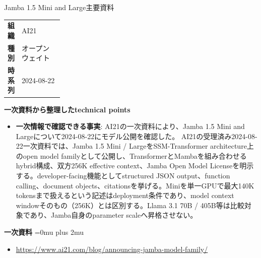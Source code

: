 \begin{technicalnote}{Jamba 1.5 Mini and Large}{主要資料}
\begingroup
\begin{tabularx}{\linewidth}{@{}>{\bfseries}p{0.22\linewidth}X@{}}
組織 & AI21 \\
種別 & オープンウェイト \\
時系列 & 2024-08-22 \\
\end{tabularx}
\smallskip
{\bfseries 一次資料から整理したtechnical points}
\begin{itemize}[leftmargin=1.5em,itemsep=0.35em]
\item \textbf{一次情報で確認できる事実}: AI21の一次資料により、Jamba 1.5 Mini and Largeについて2024-08-22にモデル公開を確認した。 AI21の受理済み2024-08-22一次資料では、Jamba 1.5 Mini / LargeをSSM-Transformer architecture上のopen model familyとして公開し、TransformerとMambaを組み合わせるhybrid構成、双方256K effective context、Jamba Open Model Licenseを明示する。developer-facing機能としてstructured JSON output、function calling、document objects、citationsを挙げる。Miniを単一GPUで最大140K tokensまで扱えるという記述はdeployment条件であり、model context windowそのもの（256K）とは区別する。Llama 3.1 70B / 405B等は比較対象であり、Jamba自身のparameter scaleへ昇格させない。
\end{itemize}
\begin{minipage}{\linewidth}
\begin{samepage}
{\bfseries 一次資料}
\begingroup\sloppy
\Urlmuskip=0mu plus 2mu\relax
\begin{itemize}[leftmargin=1.5em,itemsep=0.25em]
\item {\scriptsize\url{https://www.ai21.com/blog/announcing-jamba-model-family/}}
\end{itemize}
\endgroup
\end{samepage}
\end{minipage}
\endgroup
\end{technicalnote}
\medskip

